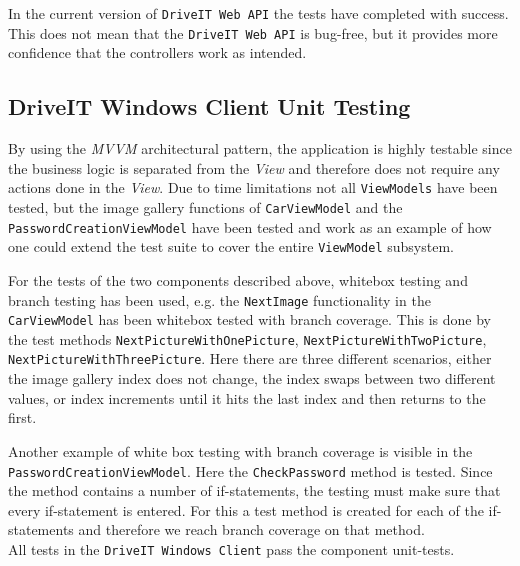In the current version of \texttt{DriveIT Web API} the tests have completed with success. This does not mean that the \texttt{DriveIT Web API} is bug-free, but it provides more confidence that the controllers work as intended.

\subsection{DriveIT Windows Client Unit Testing}
By using the \textit{MVVM} architectural pattern, the application is highly testable since the business logic is separated from the \textit{View} and therefore does not require any actions done in the \textit{View}. Due to time limitations not all \texttt{ViewModels} have been tested, but the image gallery functions of \texttt{CarViewModel} and the \texttt{PasswordCreationViewModel} have been tested and work as an example of how one could extend the test suite to cover the entire \texttt{ViewModel} subsystem.

For the tests of the two components described above, whitebox testing and branch testing has been used, e.g. the \texttt{NextImage} functionality in the \texttt{CarViewModel} has been whitebox tested with branch coverage. This is done by the test methods \texttt{NextPictureWithOnePicture}, \texttt{NextPictureWithTwoPicture}, \texttt{NextPictureWithThreePicture}. Here there are three different scenarios, either the image gallery index does not change, the index swaps between two different values, or index increments until it hits the last index and then returns to the first. 

Another example of white box testing with branch coverage is visible in the \texttt{PasswordCreationViewModel}. Here the \texttt{CheckPassword} method is tested. Since the method contains a number of if-statements, the testing must make sure that every if-statement is entered. For this a test method is created for each of the if-statements and therefore we reach branch coverage on that method.\\

All tests in the \texttt{DriveIT Windows Client} pass the component unit-tests.
